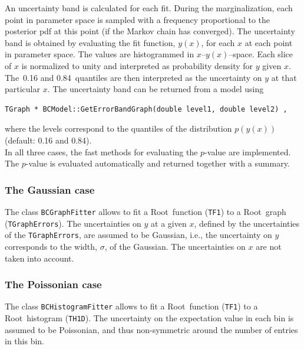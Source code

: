 \documentclass[11pt, a4paper]{article}
\newcommand{\Root}{{\sc Root}}
\begin{document}
\noindent 
An uncertainty band is calculated for each fit. During the
marginalization, each point in parameter space is sampled with a
frequency proportional to the posterior pdf at this point (if the
Markov chain has converged). The uncertainty band is obtained by
evaluating the fit function, $y(x)$, for each $x$ at each point in
parameter space. The values are histogrammed in
$x$--$y(x)$--space. Each slice of $x$ is normalized to unity and
interpreted as probability density for $y$ given $x$. The~0.16 and
0.84~quantiles are then interpreted as the uncertainty on $y$ at that
particular $x$. The uncertainty band can be returned from a model using 
%
\begin{verbatim}
TGraph * BCModel::GetErrorBandGraph(double level1, double level2) ,  
\end{verbatim}
%
where the levels correspond to the quantiles of the distribution
$p(y(x))$ (default: 0.16 and 0.84). \\

\noindent 
In all three cases, the fast methods for evaluating the $p$-value are
implemented. The $p$-value is evaluated automatically and returned
together with a summary.


\subsubsection{The Gaussian case} 

The class \verb|BCGraphFitter| allows to fit a \Root\ function
(\verb|TF1|) to a \Root\ graph (\verb|TGraphErrors|). The
uncertainties on $y$ at a given $x$, defined by the uncertainties of
the \verb|TGraphErrors|, are assumed to be Gaussian, i.e., the
uncertainty on $y$ corresponds to the width, $\sigma$, of the
Gaussian. The uncertainties on $x$ are not taken into account.


\subsubsection{The Poissonian case} 

The class \verb|BCHistogramFitter| allows to fit a \Root\ function
(\verb|TF1|) to a \Root\ histogram (\verb|TH1D|). The uncertainty on
the expectation value in each bin is assumed to be Poissonian, and
thus non-symmetric around the number of entries in this bin.
\end{document}
